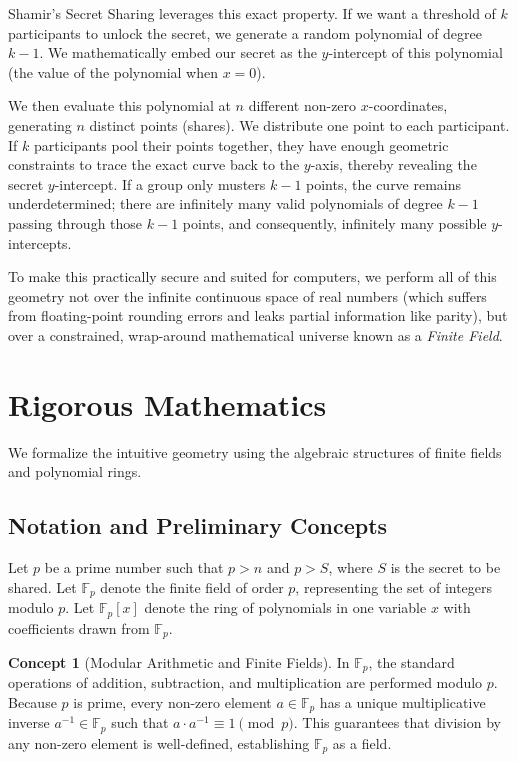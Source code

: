 \documentclass[12pt]{article}
\theoremstyle{definition}
\newtheorem{concept}{Concept}
\theoremstyle{plain}
\begin{document}
	Shamir's Secret Sharing leverages this exact property. If we want a threshold of $k$ participants to unlock the secret, we generate a random polynomial of degree $k-1$. We mathematically embed our secret as the $y$-intercept of this polynomial (the value of the polynomial when $x = 0$). 
	
	We then evaluate this polynomial at $n$ different non-zero $x$-coordinates, generating $n$ distinct points (shares). We distribute one point to each participant. 
	If $k$ participants pool their points together, they have enough geometric constraints to trace the exact curve back to the $y$-axis, thereby revealing the secret $y$-intercept. If a group only musters $k-1$ points, the curve remains underdetermined; there are infinitely many valid polynomials of degree $k-1$ passing through those $k-1$ points, and consequently, infinitely many possible $y$-intercepts. 
	
	To make this practically secure and suited for computers, we perform all of this geometry not over the infinite continuous space of real numbers (which suffers from floating-point rounding errors and leaks partial information like parity), but over a constrained, wrap-around mathematical universe known as a \textit{Finite Field}.
	
	\section{Rigorous Mathematics}
	
	We formalize the intuitive geometry using the algebraic structures of finite fields and polynomial rings.
	
	\subsection{Notation and Preliminary Concepts}
	Let $p$ be a prime number such that $p > n$ and $p > S$, where $S$ is the secret to be shared. 
	Let $\mathbb{F}_p$ denote the finite field of order $p$, representing the set of integers modulo $p$. 
	Let $\mathbb{F}_p[x]$ denote the ring of polynomials in one variable $x$ with coefficients drawn from $\mathbb{F}_p$. 
	
	\begin{concept}[Modular Arithmetic and Finite Fields]
		In $\mathbb{F}_p$, the standard operations of addition, subtraction, and multiplication are performed modulo $p$. Because $p$ is prime, every non-zero element $a \in \mathbb{F}_p$ has a unique multiplicative inverse $a^{-1} \in \mathbb{F}_p$ such that $a \cdot a^{-1} \equiv 1 \pmod p$. This guarantees that division by any non-zero element is well-defined, establishing $\mathbb{F}_p$ as a field.
	\end{concept}
	
\end{document}
